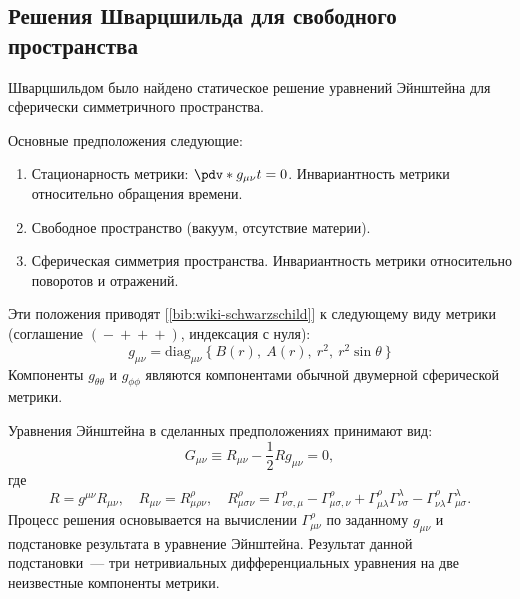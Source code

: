 \documentclass[\docroot/reports/draft/report.tex]{subfiles}
\begin{document}
\onlyinsubfile{\tableofcontents}

\subsection{Решения Шварцшильда для свободного пространства}

    Шварцшильдом было найдено статическое решение уравнений Эйнштейна для сферически симметричного пространства.

    Основные предположения следующие:
    \begin{enumerate}
        \item Стационарность метрики: $\pdv*{g_{\mu\nu}}{t} = 0$. Инвариантность метрики относительно обращения времени.
        \item Свободное пространство (вакуум, отсутствие материи).
        \item Сферическая симметрия пространства. Инвариантность метрики относительно поворотов и отражений.
    \end{enumerate}
    Эти положения приводят [\ref{bib:wiki-schwarzschild}] к следующему виду метрики (соглашение $({}-{}+{}+{}+{})$, индексация с нуля):
    \begin{equation*}
        g_{\mu\nu} = \text{diag}_{\mu\nu}\ \{\ B(r),\ A(r),\ r^2,\ r^2 \sin\theta \ \}
    \end{equation*}
    Компоненты $g_{\theta\theta}$ и $g_{\phi\phi}$ являются компонентами обычной двумерной сферической метрики.

    Уравнения Эйнштейна в сделанных предположениях принимают вид:
    \begin{equation*}
        G_{\mu\nu} \equiv R_{\mu\nu} - \frac{1}{2} R g_{\mu\nu} = 0 ,
    \end{equation*}
    где
    \begin{equation*}
        R = g^{\mu\nu} R_{\mu\nu} , \quad
        R_{\mu\nu} = R^\rho_{\mu\rho\nu} , \quad
        R^\rho_{\mu\sigma\nu} = \Gamma^\rho_{\nu\sigma,\mu} - \Gamma^\rho_{\mu\sigma,\nu} + \Gamma^\rho_{\mu\lambda}\Gamma^\lambda_{\nu\sigma} - \Gamma^\rho_{\nu\lambda}\Gamma^\lambda_{\mu\sigma} .
    \end{equation*}
    Процесс решения основывается на вычислении $\Gamma^\rho_{\mu\nu}$ по заданному $g_{\mu\nu}$ и подстановке результата в уравнение Эйнштейна. Результат данной подстановки~--- три нетривиальных дифференциальных уравнения на две неизвестные компоненты метрики.
\end{document}
